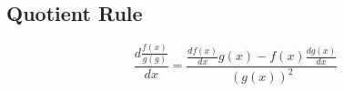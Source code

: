 \subsection{Quotient Rule}
\begin{equation}
\frac{d \frac{f(x)}{g(g)}}{dx}=\frac {\frac{df(x)}{dx}g(x)-f(x)\frac{dg(x)}{dx}}{(g(x))^{2}}\label{eq:calc-qr}
\end{equation}